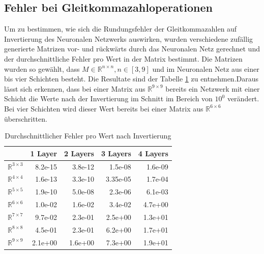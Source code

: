 \documentclass[Interploate_hadwritten_Digits.tex]{subfiles}
\begin{document}
	\subsection{Fehler bei Gleitkommazahloperationen}
	\label{sec:results_error_inverse}
	Um zu bestimmen, wie sich die Rundungsfehler der Gleitkommazahlen auf Invertierung des Neuronalen Netzwerks auswirken, wurden verschiedene zufällig generierte Matrizen vor- und rückwärts durch das Neuronalen Netz gerechnet und der durchschnittliche Fehler pro Wert in der Matrix bestimmt. Die Matrizen wurden so gewählt, dass $ M \in \mathbb{R}^{n \times n}, n \in [3, 9] $ und im Neuronalen Netz aus einer bis vier Schichten besteht. Die Resultate sind der Tabelle \ref{tbl:reverse_error} zu entnehmen.Daraus lässt sich erkennen, dass bei einer Matrix aus $ \mathbb{R}^{9 \times 9} $ bereits ein Netzwerk mit einer Schicht die Werte nach der Invertierung im Schnitt im Bereich von $ 10^{0} $ verändert. Bei vier Schichten wird dieser Wert bereits bei einer Matrix aus $ \mathbb{R}^{6 \times 6} $ überschritten.
	\begin{table}[H]
		\centering
		\begin{tabular}{|l|r|r|r|r|}
			\hline
			 & 1 Layer & 2 Layers & 3 Layers & 4 Layers  \\ \hline
			$ \mathbb{R}^{3 \times 3} $ & 8.2e-15 & 3.8e-12 & 1.5e-08 & 1.6e-09 \\ \hline
			$ \mathbb{R}^{4 \times 4} $ & 1.6e-13 & 3.3e-10 & 3.35e-05 & 1.7e-04 \\ \hline
			$ \mathbb{R}^{5 \times 5} $ & 1.9e-10 & 5.0e-08 & 2.3e-06 & 6.1e-03 \\ \hline
			$ \mathbb{R}^{6 \times 6} $ & 1.0e-02 & 1.6e-02 & 3.4e-02 & 4.7e+00 \\ \hline
			$ \mathbb{R}^{7 \times 7} $ & 9.7e-02 & 2.3e-01 & 2.5e+00 & 1.3e+01 \\ \hline
			$ \mathbb{R}^{8 \times 8} $ & 4.5e-01 & 2.3e-01 & 6.2e+00 & 1.7e+01 \\ \hline
			$ \mathbb{R}^{9 \times 9} $ & 2.1e+00 & 1.6e+00 & 7.3e+00 & 1.9e+01 \\ \hline
		\end{tabular}
		\caption{Durchschnittlicher Fehler pro Wert nach Invertierung}
		\label{tbl:reverse_error}
	\end{table}	
	
\end{document}
